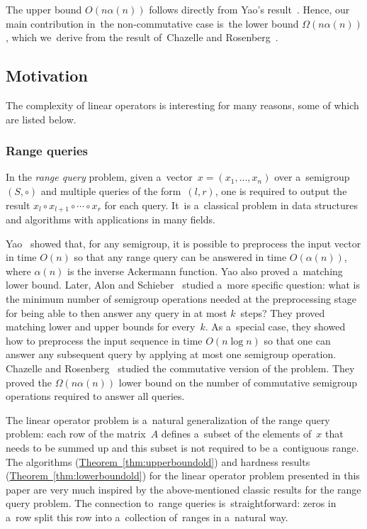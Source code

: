 \documentclass[11pt]{article}
\numberwithin{equation}{section}
\theoremstyle{definition}
\theoremstyle{plain}
\newcommand{\expref}[2]{\hyperref[#2]{#1~\ref{#2}}}
\theoremstyle{plain}\newtheorem{observation}[theorem]{Observation}
\begin{document}
The upper bound $O(n\alpha(n))$ follows directly
from Yao's result~\cite{DBLP:conf/stoc/Yao82}.
Hence, our main contribution in~the non-commutative case
is~the lower bound $\Omega(n\alpha(n))$,
which we~derive from the result
of~Chazelle and Rosenberg~\cite{DBLP:journals/ijcga/ChazelleR91}.

\subsection{Motivation}
The complexity of linear operators is interesting for many reasons, some of
which are listed below.

%
%
%
\subsubsection{Range queries}  In the
%
%
\emph{range query} problem,
%
%
%
%
%
 given a~vector~$x=(x_1, \dotsc, x_n)$ over a~semigroup $(S, \circ)$ and
multiple queries of the form~$(l,r)$, one is required to
output the result $x_l \circ x_{l+1} \circ \dotsb \circ x_r$
for each query. It~is a~classical problem in data structures and
algorithms with applications in many fields.

Yao~\cite{DBLP:conf/stoc/Yao82} showed that, for any semigroup, it is possible
to preprocess the input vector in time $O(n)$ so that
%
%
%
any range query can be answered %
in time $O(\alpha(n))$, where $\alpha(n)$ is the inverse Ackermann
%
function.  Yao also  %
proved a~matching lower bound.
%
Later, Alon and
Schieber~\cite{Alon87optimalpreprocessing} studied a~more specific question:
what is the minimum number of semigroup operations needed at the preprocessing
stage for being able to then answer any query in at most $k$~steps? They proved
matching lower and upper bounds for every~$k$. As a~special case, they showed
how to preprocess the input sequence in time $O(n\log n)$
%
so that one can %
answer any
subsequent query by applying at most one semigroup operation.
Chazelle and Rosenberg~\cite{DBLP:journals/ijcga/ChazelleR91} studied the
commutative version of the problem. They proved the $\Omega(n \alpha(n))$ lower
bound on the number of commutative semigroup operations required to answer all
queries.

The linear operator problem is a~natural generalization of the
%
%
range query problem:
each row of the matrix~$A$ defines a~subset of the elements of~$x$
that needs to be summed up and this subset is not required to be
a~contiguous range. The algorithms (\expref{Theorem}{thm:upperboundold}) and hardness
results (\expref{Theorem}{thm:lowerboundold}) for the linear operator problem presented
in this paper are very much inspired by the above-mentioned classic results for
%
%
the range query problem.
The connection to~range queries is~straightforward:
zeros in a~row split this row into a~collection of~ranges in a~natural way.
\end{document}
